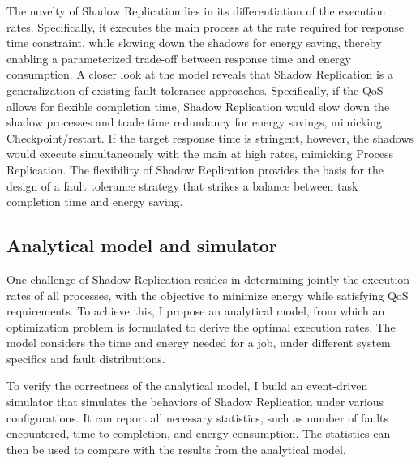 The novelty of Shadow Replication lies in its differentiation of the execution rates. Specifically, it 
executes the main process at the rate required for response time constraint, while slowing down the shadows for energy saving, thereby enabling a parameterized trade-off between response time and energy consumption.
A closer look at the model reveals that Shadow
Replication is a generalization of existing fault tolerance
approaches. %
Specifically, if the
QoS allows for flexible completion time, Shadow
Replication would slow down the shadow processes and trade time
redundancy for energy savings, mimicking Checkpoint/restart. %
If the target response time is
stringent, however, %
the shadows would execute simultaneously with the main at high
rates, mimicking Process Replication. The flexibility of Shadow Replication provides the
basis for the design of a fault tolerance strategy that strikes a
balance between task completion time and energy saving.%

\subsection{Analytical model and simulator}

One challenge of Shadow Replication resides in determining
jointly the execution rates of all processes, %
with the objective to minimize energy while satisfying QoS requirements. To achieve this, I propose an analytical
model, from which an optimization problem is formulated to derive the optimal execution rates. The model considers the time and energy needed for a job, %
under different system specifics and fault distributions. %

To verify the correctness of the analytical model, I build an event-driven simulator that simulates the behaviors of Shadow Replication under various configurations. It can report all necessary statistics, such as number of faults encountered, time to completion, and energy consumption. The statistics can then be used to compare with the results from the analytical model.

